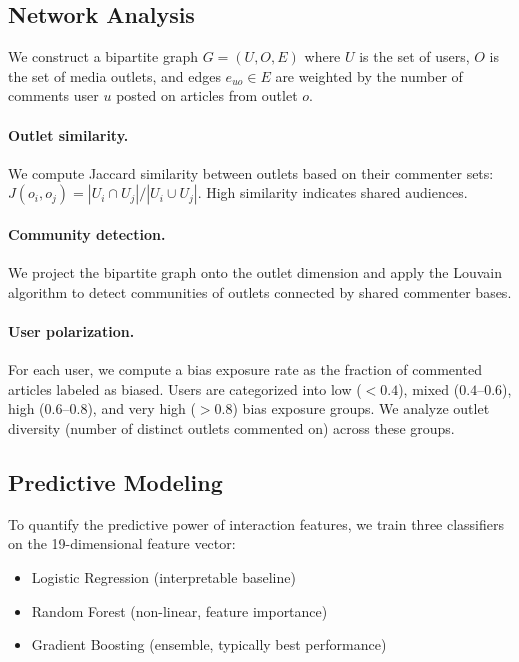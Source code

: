 \subsection{Network Analysis}

We construct a bipartite graph $G = (U, O, E)$ where $U$ is the set of users, $O$ is the set of media outlets, and edges $e_{uo} \in E$ are weighted by the number of comments user $u$ posted on articles from outlet $o$.

\paragraph{Outlet similarity.}
We compute Jaccard similarity between outlets based on their commenter sets: $J(o_i, o_j) = |U_i \cap U_j| / |U_i \cup U_j|$.
High similarity indicates shared audiences.

\paragraph{Community detection.}
We project the bipartite graph onto the outlet dimension and apply the Louvain algorithm \cite{blondel2008fast} to detect communities of outlets connected by shared commenter bases.

\paragraph{User polarization.}
For each user, we compute a bias exposure rate as the fraction of commented articles labeled as biased.
Users are categorized into low ($<0.4$), mixed ($0.4$--$0.6$), high ($0.6$--$0.8$), and very high ($>0.8$) bias exposure groups.
We analyze outlet diversity (number of distinct outlets commented on) across these groups.

\subsection{Predictive Modeling}

To quantify the predictive power of interaction features, we train three classifiers on the 19-dimensional feature vector:
\begin{itemize}
    \item Logistic Regression (interpretable baseline)
    \item Random Forest (non-linear, feature importance)
    \item Gradient Boosting (ensemble, typically best performance)
\end{itemize}

